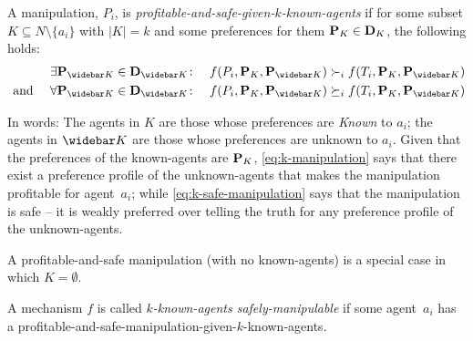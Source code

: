 \begin{definition}
A manipulation, $P_i$, is \emph{profitable-and-safe-given-$k$-known-agents} if for some subset $K \subseteq N \setminus \{a_i\}$ with $|K| = k$ and some preferences for them $\mathbf{P}_{K} \in \mathbf{D}_{K}$, the following holds:
    \begin{align}
    \label{eq:k-manipulation}
            \quad \exists \prefsOf{\notK} \in \domainsOf{\notK} \colon \quad f(P_i,\prefsOf{K}, \prefsOf{\notK}) \succ_i f(T_i,\prefsOf{K}, \prefsOf{\notK})
            \\
    \label{eq:k-safe-manipulation}
            \text{ and } \quad   \forall \prefsOf{\notK} \in \domainsOf{\notK} \colon \quad f(P_i,\prefsOf{K}, \prefsOf{\notK}) \succeq_i f(T_i,\prefsOf{K}, \prefsOf{\notK})
    \end{align}
\end{definition}
In words: The agents in $K$ are those  whose preferences are \emph{Known} to $a_i$; the agents in $\notK$ are those whose preferences are unknown to $a_i$.
Given that the preferences of the known-agents are $\mathbf{P}_{K}$, \eqref{eq:k-manipulation} says that there exist a preference profile of the unknown-agents that makes the manipulation profitable for agent~$a_i$; while \eqref{eq:k-safe-manipulation} says that the manipulation is safe -- it is weakly preferred over telling the truth for any preference profile of the unknown-agents.

%
%


%
A profitable-and-safe manipulation (with no known-agents) is a special case in which $K=\emptyset$.

\begin{definition}
A mechanism $f$ is called \emph{$k$-known-agents safely-manipulable} if some agent~$a_i$ has a profitable-and-safe-manipulation-given-$k$-known-agents.
\end{definition}

